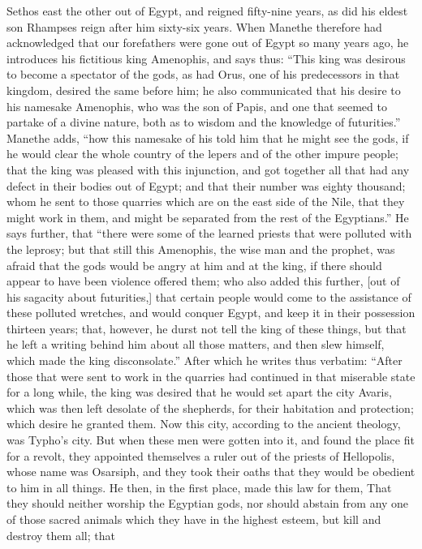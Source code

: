 Sethos east the other out of Egypt, and reigned fifty-nine years, as did
his eldest son Rhampses reign after him sixty-six years. When Manethe
therefore had acknowledged that our forefathers were gone out of Egypt so
many years ago, he introduces his fictitious king Amenophis, and says
thus: ``This king was desirous to become a spectator of the gods, as had
Orus, one of his predecessors in that kingdom, desired the same before
him; he also communicated that his desire to his namesake Amenophis, who
was the son of Papis, and one that seemed to partake of a divine nature,
both as to wisdom and the knowledge of futurities.'' Manethe adds, ``how
this namesake of his told him that he might see the gods, if he would
clear the whole country of the lepers and of the other impure people; that
the king was pleased with this injunction, and got together all that had
any defect in their bodies out of Egypt; and that their number was eighty
thousand; whom he sent to those quarries which are on the east side of the
Nile, that they might work in them, and might be separated from the rest
of the Egyptians.'' He says further, that ``there were some of the learned
priests that were polluted with the leprosy; but that still this
Amenophis, the wise man and the prophet, was afraid that the gods would be
angry at him and at the king, if there should appear to have been violence
offered them; who also added this further, [out of his sagacity about
futurities,] that certain people would come to the assistance of these
polluted wretches, and would conquer Egypt, and keep it in their
possession thirteen years; that, however, he durst not tell the king of
these things, but that he left a writing behind him about all those
matters, and then slew himself, which made the king disconsolate.'' After
which he writes thus verbatim: ``After those that were sent to work in the
quarries had continued in that miserable state for a long while, the king
was desired that he would set apart the city Avaris, which was then left
desolate of the shepherds, for their habitation and protection; which
desire he granted them. Now this city, according to the ancient theology,
was Typho's city. But when these men were gotten into it, and found the
place fit for a revolt, they appointed themselves a ruler out of the
priests of Hellopolis, whose name was Osarsiph, and they took their oaths
that they would be obedient to him in all things. He then, in the first
place, made this law for them, That they should neither worship the
Egyptian gods, nor should abstain from any one of those sacred animals
which they have in the highest esteem, but kill and destroy them all; that
